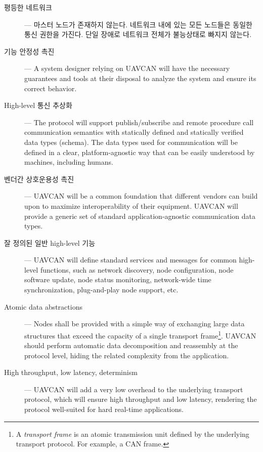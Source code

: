 \begin{description}
    \item[평등한 네트워크] --- 마스터 노드가 존재하지 않는다.
    네트워크 내에 있는 모든 노드들은 동일한 통신 권한을 가진다. 단일 장애로 네트워크 전체가 불능상태로 빠지지 않는다.

    \item[기능 안정성 촉진] --- A system designer relying on UAVCAN will have the necessary
    guarantees and tools at their disposal to analyze the system and ensure its correct behavior.

    \item[High-level 통신 추상화] --- The protocol will support publish/subscribe and remote procedure
    call communication semantics with statically defined and statically verified data types (schema).
    The data types used for communication will be defined in a clear, platform-agnostic way
    that can be easily understood by machines, including humans.  %

    \item[벤더간 상호운용성 촉진] --- UAVCAN will be a common foundation that
    different vendors can build upon to maximize interoperability of their equipment.
    UAVCAN will provide a generic set of standard application-agnostic communication data types.

    \item[잘 정의된 일반 high-level 기능] --- UAVCAN will define standard services
    and messages for common high-level functions, such as network discovery, node configuration,
    node software update, node status monitoring, network-wide time synchronization, plug-and-play node support, etc.

    \item[Atomic data abstractions] --- Nodes shall be provided with a simple way of exchanging large
    data structures that exceed the capacity of a single transport frame\footnote{%
        A \emph{transport frame} is an atomic transmission unit defined by the underlying transport protocol.
        For example, a CAN frame.
    }.
    UAVCAN should perform automatic data decomposition and reassembly at the protocol level,
    hiding the related complexity from the application.

    \item[High throughput, low latency, determinism] --- UAVCAN will add a very low overhead to the underlying
    transport protocol, which will ensure high throughput and low latency, rendering the protocol well-suited
    for hard real-time applications.


\end{description}
